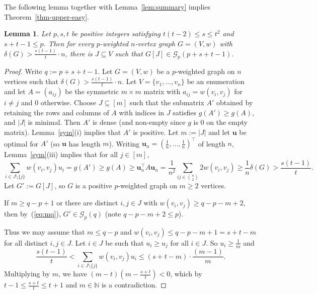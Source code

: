 \documentclass[11pt, a4paper]{article}
\newtheorem{lemma}[theorem]{Lemma}
\theoremstyle{definition}
\newcommand{\cG}{\mathcal{G}}
\begin{document}
The following lemma together with Lemma~\ref{lem:summary} implies Theorem~\ref{thm-upper-easy}.


\begin{lemma}\label{uppertilde}
	Let $p,s,t$ be positive integers satisfying $t(t-2) \leq s \leq t^2$ and $s+t-1 \leq p$. Then
	for every $p$-weighted $n$-vertex graph $G=(V,w)$ with $\delta(G) > \frac{s(t-1)}{t}\cdot n$,
	there is $J \subseteq V$ such that $G[J] \in \cG_p(p+s+t-1)$.
\end{lemma}

\begin{proof}
	Write $q := p+s+t-1$.
	Let $G=(V,w)$ be a $p$-weighted graph on $n$ vertices such that $\delta(G) > \frac{s(t-1)}{t} \cdot n$. 
	Let $V=\{v_1,\ldots,v_n\}$ be an enumeration and let $A = (a_{ij})$ be the symmetric $m \times m$ matrix with $a_{ij}=w(v_i,v_j)$ for $i \neq j$ and $0$ otherwise.
	Choose $J \subseteq [m]$ such that the submatrix $A'$ obtained by retaining the rows and columns of $A$ with indices in $J$ satisfies $g(A') \geq g(A)$, and $|J|$ is minimal.
	Then $A'$ is dense (and non-empty since $g$ is $0$ on the empty matrix).
	Lemma~\ref{sym}(i) implies that $A'$ is positive.
	Let $m := |J|$
	and let $\bm{u}$ be optimal for $A'$ (so $\bm{u}$ has length $m$).
	Writing $\bm{u}_n=(\frac{1}{n},\ldots,\frac{1}{n})^\intercal$ of length $n$, Lemma~\ref{sym}(iii) implies that for all $j\in[m]$,
	$$
	\sum_{i \in J\setminus\{j\}}w(v_i,v_j)u_i = g(A') \geq g(A) \geq \bm{u}_n^\intercal A \bm{u}_n = \frac{1}{n^2}\sum_{ij \in \binom{n}{2}}2w(v_i,v_j) \geq \frac{1}{n}\delta(G) > \frac{s(t-1)}{t}.
	$$
	Let $G' := G[J]$, so $G$ is a positive $p$-weighted graph on $m\ge 2$ vertices.
	
	If $m \geq q-p+1$ or there are distinct $i,j \in J$ with $w(v_i,v_j) \geq q-p-m+2$, then by~(\ref{eq:mq}), $G' \in \mathcal{G}_p(q)$ (note $q-p-m+2 \leq p$).
	
	Thus we may assume that $m \leq q-p$ and $w(v_i,v_j) \leq q-p-m+1=s+t-m$ for all distinct $i,j \in J$.
	Let $i \in J$ be such that $u_i \geq u_j$ for all $i \in J$. So $u_i \geq \frac{1}{m}$ and
	\begin{equation}\label{eq:cont}
		\frac{s(t-1)}{t} < \sum_{i \in J\setminus\{j\}}w(v_i,v_j)u_i  \leq (s+t-m)\cdot \frac{(m-1)}{m}.
	\end{equation}
Multiplying by $m$, we have $(m-t)(m-\frac{s+t}{t}) < 0$, which by $t-1 \leq \frac{s+t}{t} \leq t+1$ and $m \in \mathbb{N}$ is a contradiction.
\end{proof}
\end{document}
